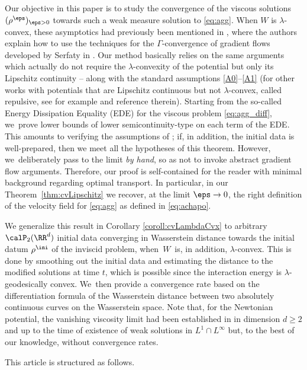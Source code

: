 Our objective in this paper is to study the convergence of the viscous solutions $(\rho^\eps)_{\eps>0}$ towards such a weak measure solution to \eqref{eq:agg}. When $W$ is $\lambda$-convex, these asymptotics had previously been mentioned in \cite{carrilloReview18}, where the authors explain how to use the techniques for the $\Gamma$-convergence of gradient flows developed by Serfaty in \cite{serfaty10}. Our method basically relies on the same arguments which actually do not require the $\lambda$-convexity of the potential but only its Lipschitz continuity -- along with the standard assumptions \eqref{A0}--\eqref{A1} (for other works with potentials that are Lipschitz continuous but not $\lambda$-convex, called repulsive, see for example \cite{raoul} and reference therein). Starting from the so-called Energy Dissipation Equality (EDE) for the viscous problem \eqref{eq:agg_diff}, we~prove lower bounds of lower semicontinuity-type on each term of the EDE. This amounts to verifying the assumptions of \cite[Th.\,2]{serfaty10}; if, in addition, the initial data is well-prepared, then we meet all the hypotheses of this theorem. However, we~deliberately pass to the limit \textit{by hand}, so as not to invoke abstract gradient flow arguments. Therefore, our proof is self-contained for the reader with minimal background regarding optimal transport. In particular, in our Theorem~\ref{thm:cvLipschitz} we recover, at the limit $\eps \to 0$, the right definition of the velocity field for \eqref{eq:agg} as defined in \eqref{eq:achapo}.

We generalize this result in Corollary \ref{coroll:cvLambdaCvx} to arbitrary $\calP_2(\RR^d)$ initial data converging in Wasserstein distance towards the initial datum $\rho^{\ini}$ of the inviscid problem, when~$W$~is, in addition, $\lambda$-convex. This is done by smoothing out the initial data and estimating the distance to the modified solutions at time $t$, which is possible since the interaction energy is $\lambda$-geodesically convex. We~then provide a convergence rate based on the differentiation formula of the Wasserstein distance between two absolutely continuous curves on the Wasserstein space. Note that, for the Newtonian potential, the vanishing viscosity limit had been established in \cite{cozzi16} in dimension $d \geq 2$ and up to the time of existence of weak solutions in $L^1 \cap L^\infty$ but, to the best of our knowledge, without convergence rates.

This article is structured as follows.\enlargethispage{.5\baselineskip}%

